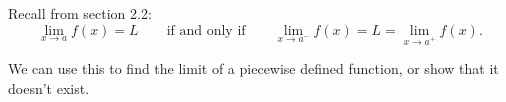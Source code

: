 \begin{frame}
Recall from section 2.2:
\[
\lim_{x\rightarrow a}f(x) = L \qquad \text{if and only if} \qquad \lim_{x\rightarrow a^-}f(x) = L = \lim_{x\rightarrow a^+}f(x) .
\]

We can use this to find the limit of a piecewise defined function, or show that it doesn't exist.
\end{frame}
